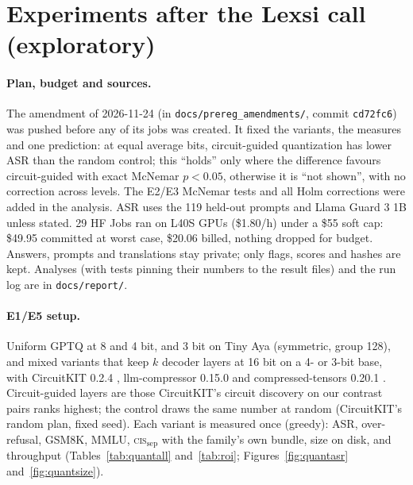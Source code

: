 \documentclass[11pt]{article}
\newcommand{\cissep}{\textsc{cis}$_{\text{sep}}$}
\begin{document}
\section{Experiments after the Lexsi call (exploratory)}
\label{app:lexsi}

\paragraph{Plan, budget and sources.} The amendment of 2026-11-24 (in \texttt{docs/prereg\_amendments/}, commit
\texttt{cd72fc6}) was pushed before any of its jobs was created. It fixed the variants, the measures and one
prediction: at equal average bits, circuit-guided quantization has lower ASR than the random control; this ``holds''
only where the difference favours circuit-guided with exact McNemar $p<0.05$, otherwise it is ``not shown'', with no
correction across levels. The E2/E3 McNemar tests and all Holm corrections were added in the analysis. ASR uses the 119 held-out prompts and
Llama Guard 3 1B unless stated. 29 HF Jobs ran on L40S GPUs (\$1.80/h) under a \$55 soft cap: \$49.95 committed at
worst case, \$20.06 billed, nothing dropped for budget. Answers, prompts and translations stay private; only flags,
scores and hashes are kept. Analyses (with tests pinning their numbers to the result files) and the run log are in \texttt{docs/report/}.

\paragraph{E1/E5 setup.} Uniform GPTQ \citep{frantar2022gptq} at 8 and 4 bit, and 3 bit on Tiny Aya (symmetric, group
128), and mixed variants that keep $k$ decoder layers at 16 bit on a 4- or 3-bit base, with CircuitKIT 0.2.4 \citep{seth2026circuitkit}, llm-compressor 0.15.0
\citep{vllm2026llmcompressor} and compressed-tensors 0.20.1 \citep{vllm2026compressedtensors}. Circuit-guided layers
are those CircuitKIT's circuit discovery on our contrast pairs ranks highest; the control draws the same number at
random (CircuitKIT's random plan, fixed seed). Each variant is measured once (greedy): ASR, over-refusal, GSM8K,
MMLU, \cissep{} with the family's own bundle, size on disk, and throughput (Tables~\ref{tab:quantall}
and~\ref{tab:roi}; Figures~\ref{fig:quantasr} and~\ref{fig:quantsize}).
\end{document}
